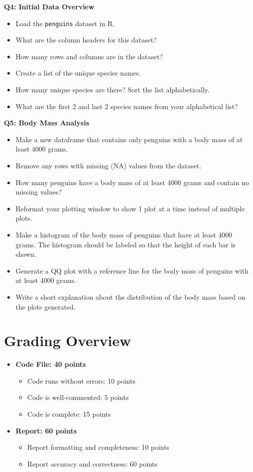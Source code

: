 \documentclass{article}
\begin{document}
\textbf{Q4: Initial Data Overview}
\begin{itemize}
    \item Load the \texttt{penguins} dataset in R.
    \item What are the column headers for this dataset?
    \item How many rows and columns are in the dataset?
    \item Create a list of the unique species names.
    \item How many unique species are there? Sort the list alphabetically.
    \item What are the first 2 and last 2 species names from your alphabetical list?
\end{itemize}

\textbf{Q5: Body Mass Analysis}
\begin{itemize}
    \item Make a new dataframe that contains only penguins with a body mass of at least 4000 grams.
    \item Remove any rows with missing (NA) values from the dataset.
    \item How many penguins have a body mass of at least 4000 grams and contain no missing values?
    \item Reformat your plotting window to show 1 plot at a time instead of multiple plots.
    \item Make a histogram of the body mass of penguins that have at least 4000 grams. The histogram should be labeled so that the height of each bar is shown.
    \item Generate a QQ plot with a reference line for the body mass of penguins with at least 4000 grams.
    \item Write a short explanation about the distribution of the body mass based on the plots generated.
\end{itemize}

\newpage

\section{Grading Overview}
\begin{itemize}
    \item \textbf{Code File: 40 points}
    \begin{itemize}
        \item Code runs without errors: 10 points
        \item Code is well-commented: 5 points
        \item Code is complete: 15 points
    \end{itemize}
    \item \textbf{Report: 60 points}
    \begin{itemize}
        \item Report formatting and completeness: 10 points
        \item Report accuracy and correctness: 60 points
    \end{itemize}
\end{itemize}
\end{document}
